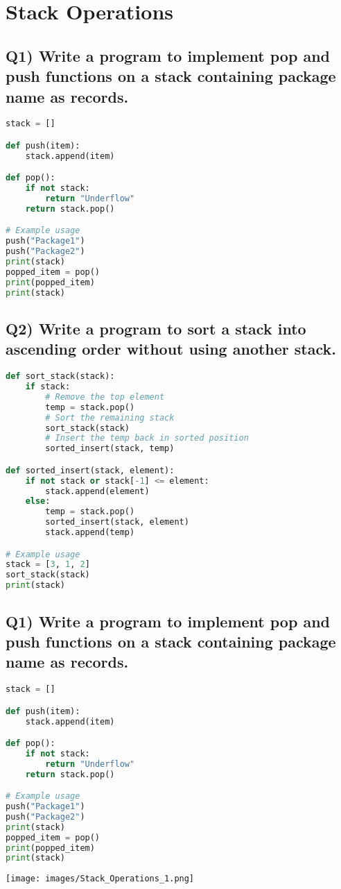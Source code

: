 \documentclass{article}
\begin{document}
\section{Stack Operations}

\subsection*{Q1) Write a program to implement pop and push functions on a stack containing package name as records.}
\begin{lstlisting}[language=Python]
stack = []

def push(item):
    stack.append(item)

def pop():
    if not stack:
        return "Underflow"
    return stack.pop()

# Example usage
push("Package1")
push("Package2")
print(stack)
popped_item = pop()
print(popped_item)
print(stack)
\end{lstlisting}

\subsection*{Q2) Write a program to sort a stack into ascending order without using another stack.}
\begin{lstlisting}[language=Python]
def sort_stack(stack):
    if stack:
        # Remove the top element
        temp = stack.pop()
        # Sort the remaining stack
        sort_stack(stack)
        # Insert the temp back in sorted position
        sorted_insert(stack, temp)

def sorted_insert(stack, element):
    if not stack or stack[-1] <= element:
        stack.append(element)
    else:
        temp = stack.pop()
        sorted_insert(stack, element)
        stack.append(temp)

# Example usage
stack = [3, 1, 2]
sort_stack(stack)
print(stack)
\end{lstlisting}

\subsection*{Q1) Write a program to implement pop and push functions on a stack containing package name as records.}
\begin{lstlisting}[language=Python]
stack = []

def push(item):
    stack.append(item)

def pop():
    if not stack:
        return "Underflow"
    return stack.pop()

# Example usage
push("Package1")
push("Package2")
print(stack)
popped_item = pop()
print(popped_item)
print(stack)
\end{lstlisting}
\texttt{[image: images/Stack\_Operations\_1.png]}
\end{document}
